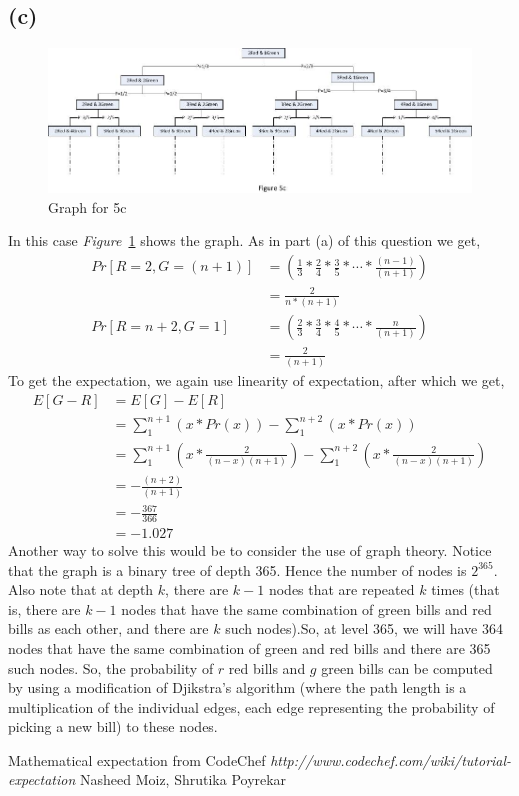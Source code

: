 \documentclass[11pt]{article}
\begin{document}
\subsection*{(c)}
\begin{figure}[h]
\centering
\includegraphics[scale=0.55]{Question5c_Figure1.jpg}
\caption{Graph for 5c}
\label{fig:fig2}
\end{figure}

In this case \emph{Figure}~\ref{fig:fig2} shows the graph. As in part (a) of this question we get,
\begin{equation*}
\begin{split}
Pr[R=2,G=(n+1)] &= \left(\frac{1}{3}*\frac{2}{4}*\frac{3}{5}*\dotsm *\frac{(n-1)}{(n+1)}\right)\\
&=\frac{2}{n*(n+1)}\\
Pr[R=n+2,G=1] &= \left(\frac{2}{3}*\frac{3}{4}*\frac{4}{5}*\dotsm *\frac{n}{(n+1)}\right)\\
&=\frac{2}{(n+1)}
\end{split}
\end{equation*}
To get the expectation, we again use linearity of expectation, after which we get,
\begin{equation*}
\begin{split}
E[G-R] &= E[G] - E[R]\\
&=\sum_1^{n+1}\left(x*Pr(x)\right) - \sum_1^{n+2}\left(x*Pr(x)\right)\\
&=\sum_1^{n+1}\left(x*\frac{2}{(n-x)(n+1)}\right) - \sum_1^{n+2}\left(x*\frac{2}{(n-x)(n+1)}\right)\\
&=-\frac{(n+2)}{(n+1)}\\
&=-\frac{367}{366}\\
&=-1.027
\end{split}
\end{equation*}
Another way to solve this would be to consider the use of graph theory.
Notice that the graph is a binary tree of depth 365. Hence the number of nodes is $2^{365}$. Also note that at depth $k$, there are $k-1$ nodes that are repeated $k$ times (that is, there are $k-1$ nodes that have the same combination of green bills and red bills as each other, and there are $k$ such nodes).So, at level 365, we will have 364 nodes that have the same combination of green and red bills and there are 365 such nodes. So, the probability of $r$ red bills and $g$ green bills can be computed by using a modification of Djikstra's algorithm (where the path length is a multiplication of the individual edges, each edge representing the probability of picking a new bill) to these nodes.  
\begin{thebibliography}{10}
Mathematical expectation from CodeChef \emph{http://www.codechef.com/wiki/tutorial-expectation}
Nasheed Moiz, Shrutika Poyrekar
\end{thebibliography}
\end{document}
